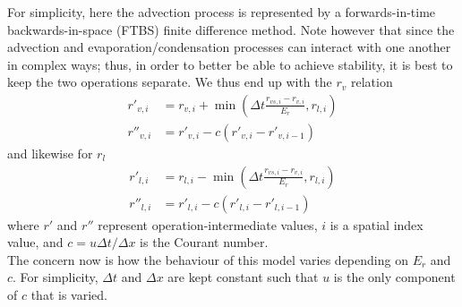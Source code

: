 \documentclass[11pt]{article}
\begin{document}
For simplicity, here the advection process is represented by a forwards-in-time backwards-in-space (FTBS) finite difference method. Note however that since the advection and evaporation/condensation processes can interact with one another in complex ways; thus, in order to better be able to achieve stability, it is best to keep the two operations separate. We thus end up with the $r_v$ relation
\begin{align} \label{eq:4}
r'_{v,i} &= r_{v,i} + \min\left(\Delta t\frac{r_{vs,i} - r_{v,i}}{E_r},r_{l,i}\right) \\ \label{eq:5}
r''_{v,i} &= r'_{v,i} - c\left(r'_{v,i} - r'_{v,i-1}\right)
\end{align}
and likewise for $r_l$
\begin{align} \label{eq:6}
r'_{l,i} &= r_{l,i} - \min\left(\Delta t\frac{r_{vs,i} - r_{v,i}}{E_r},r_{l,i}\right) \\ \label{eq:7}
r''_{l,i} &= r'_{l,i} - c\left(r'_{l,i} - r'_{l,i-1}\right)
\end{align}
where $r'$ and $r''$ represent operation-intermediate values, $i$ is a spatial index value, and $c=u \Delta t/\Delta x$ is the Courant number. \\
The concern now is how the behaviour of this model varies depending on $E_r$ and $c$. For simplicity, $\Delta t$ and $\Delta x$ are kept constant such that $u$ is the only component of $c$ that is varied.
\end{document}
